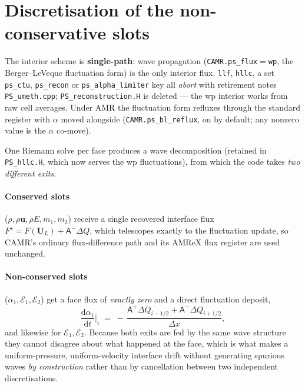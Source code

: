 \documentclass[11pt,a4paper]{article}
\newcommand{\uvec}{\mathbf{u}}
\newcommand{\code}[1]{\texttt{\small #1}}
\newcommand{\src}[1]{{\color{gray}\code{#1}}}
\begin{document}
\section{Discretisation of the non-conservative slots}
\label{sec:disc}

The interior scheme is \textbf{single-path}: wave
propagation (\code{CAMR.ps\_flux}$=$\code{wp}, the Berger--LeVeque
fluctuation form) is the only interior flux.  \code{llf}, \code{hllc}, a
set \code{ps\_ctu}, \code{ps\_recon} or \code{ps\_alpha\_limiter} key all
\emph{abort} with retirement notes \src{PS\_umeth.cpp};
\code{PS\_reconstruction.H} is deleted --- the wp interior works from raw
cell averages.  Under AMR the fluctuation form refluxes through the
standard register with $\alpha$ moved alongside
(\code{CAMR.ps\_bl\_reflux}, on by default; any nonzero value is the $\alpha$ co-move).

One Riemann solve per face produces a wave decomposition (retained in
\code{PS\_hllc.H}, which now serves the wp fluctuations), from which the
code takes \emph{two different exits}.

\paragraph{Conserved slots} ($\rho,\rho\uvec,\rho E,m_1,m_2$) receive a single
recovered interface flux $F^\star = F(\mathbf{U}_L) + \mathsf{A}^-\Delta Q$,
which telescopes exactly to the fluctuation update, so CAMR's ordinary
flux-difference path and its AMReX flux register are used unchanged.

\paragraph{Non-conserved slots} ($\alpha_1,\mathcal{E}_1,\mathcal{E}_2$) get a
face flux of \emph{exactly zero} and a direct fluctuation deposit,
\begin{equation}
  \frac{\mathrm{d}\alpha_1}{\mathrm{d}t}\Big|_i
   \;=\;-\,\frac{\mathsf{A}^+\Delta Q_{i-1/2}
                + \mathsf{A}^-\Delta Q_{i+1/2}}{\Delta x},
\end{equation}
and likewise for $\mathcal{E}_1,\mathcal{E}_2$.  Because both exits are fed by
the same wave structure they cannot disagree about what happened at the face,
which is what makes a uniform-pressure, uniform-velocity interface drift
without generating spurious waves \emph{by construction} rather than by
cancellation between two independent discretisations.
\end{document}
